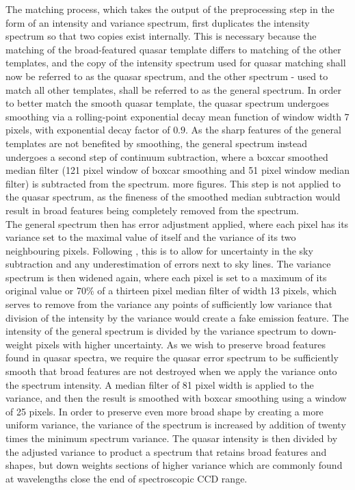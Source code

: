 \documentclass[iop]{emulateapj}
\newcommand{\green}{\color{LimeGreen}}
\begin{document}
The matching process, which takes the output of the preprocessing step in the form of an intensity and variance spectrum, first duplicates the intensity spectrum so that two copies exist internally. This is necessary because the matching of the broad-featured quasar template differs to matching of the other templates, and the copy of the intensity spectrum used for quasar matching shall now be referred to as the quasar spectrum, and the other spectrum - used to match all other templates, shall be referred to as the general spectrum. In order to better match the smooth quasar template, the quasar spectrum undergoes smoothing via a rolling-point exponential decay mean function of window width 7 pixels, with exponential decay factor of $0.9$. As the sharp features of the general templates are not benefited by smoothing, the general spectrum instead undergoes a second step of continuum subtraction, where a boxcar smoothed median filter (121 pixel window of boxcar smoothing and 51 pixel window median filter) is subtracted from the spectrum. {\green more figures}. This step is not applied to the quasar spectrum, as the fineness of the smoothed median subtraction would result in broad features being completely removed from the spectrum. \\

The general spectrum then has error adjustment applied, where each pixel has its variance set to the maximal value of itself and the variance of its two neighbouring pixels. Following \citet{baldry2014galaxy}, this is to allow for uncertainty in the sky subtraction and any underestimation of errors next to sky lines. The variance spectrum is then widened again, where each pixel is set to a maximum of its original value or 70\% of a thirteen pixel median filter of width 13 pixels, which serves to remove from the variance any points of sufficiently low variance that division of the intensity by the variance would create a fake emission feature. The intensity of the general spectrum is divided by the variance spectrum to down-weight pixels with higher uncertainty. As we wish to preserve broad features found in quasar spectra, we require the quasar error spectrum to be sufficiently smooth that broad features are not destroyed when we apply the variance onto the spectrum intensity. A median filter of 81 pixel width is applied to the variance, and then the result is smoothed with boxcar smoothing using a window of 25 pixels. In order to preserve even more broad shape by creating a more uniform variance, the variance of the spectrum is increased by addition of twenty times the minimum spectrum variance. The quasar intensity is then divided by the adjusted variance to product a spectrum that retains broad features and shapes, but down weights sections of higher variance which are commonly found at wavelengths close the end of spectroscopic CCD range.\\
\end{document}

